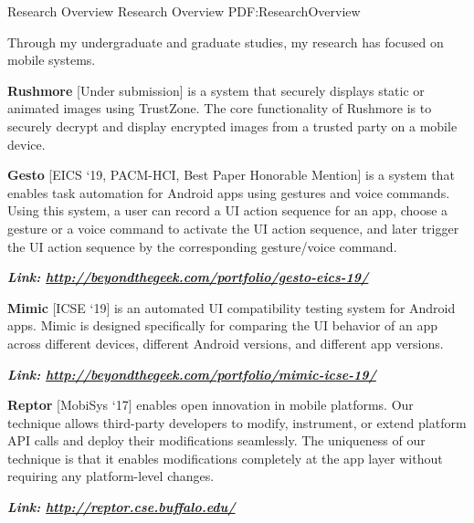 \documentclass[letterpaper,MMMyyyy,nonstopmode]{simpleresumecv}
\begin{document}
\begin{Body}

\Section
{Research Overview}
{Research Overview}
{PDF:ResearchOverview}

\Entry
Through my undergraduate and graduate studies, my research has focused on mobile systems.

\Gap
\BulletItem
\textbf{Rushmore} [Under submission] is a system that securely displays static or animated images 
using TrustZone. The core functionality of Rushmore is to securely decrypt and display encrypted 
images from a trusted party on a mobile device.
\hfill

\Gap
\BulletItem
\textbf{Gesto} [EICS `19, PACM-HCI, Best Paper Honorable Mention] is a system that enables task 
automation for Android apps using gestures 
and voice commands. Using this system, a user can record a UI action sequence for an app, 
choose a gesture or a voice command to activate the UI action sequence, and later trigger 
the UI action sequence by the corresponding gesture/voice command.

\hspace{2ex}
\textbf{\textit{Link: \href{http://beyondthegeek.com/portfolio/gesto-eics-19/}
{http://beyondthegeek.com/portfolio/gesto-eics-19/}}}
\hfill


\Gap
\BulletItem
\textbf{Mimic} [ICSE `19] is an automated UI compatibility testing system for Android apps. 
Mimic is designed specifically for comparing the UI behavior of an app across different 
devices, different Android versions, and different app versions.

\hspace{2ex}
\textbf{\textit{Link: \href{http://beyondthegeek.com/portfolio/mimic-icse-19/}{http://beyondthegeek.com/portfolio/mimic-icse-19/}}}
\hfill


\Gap
\BulletItem
\textbf{Reptor} [MobiSys `17] enables open innovation in mobile platforms. Our technique allows third-party 
developers to modify, instrument, or extend platform API calls and deploy their modifications 
seamlessly. The uniqueness of our technique is that it enables modifications completely at 
the app layer without requiring any platform-level changes. 

\hspace{2ex}
\textbf{\textit{Link: \href{http://reptor.cse.buffalo.edu/}{http://reptor.cse.buffalo.edu/}}}
\hfill





\end{Body}
\end{document}
